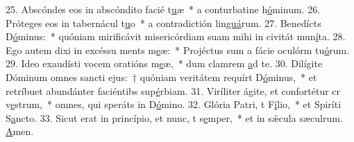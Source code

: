 25. Abscóndes eos in abscóndito facié t\uline{u}æ~* a conturbatine h\uline{ó}minum.
26. Próteges eos in tabernácul t\uline{u}o~* a contradictión lin\uline{guá}rum.
27. Benedícts D\uline{ó}minus:~* quóniam mirificávit misericórdiam suam mihi in civitát mun\uline{í}ta.
28. Ego autem dixi in excéssu ments m\uline{e}æ:~* Projéctus sum a fácie oculórm tu\uline{ó}rum.
29. Ideo exaudísti vocem oratións m\uline{e}æ,~* dum clamrem \uline{a}d te.
30. Dilígite Dóminum omnes sancti ejus:~† quóniam veritátem requírt D\uline{ó}minus,~* et retríbuet abundánter faciéntibs sup\uline{é}rbiam.
31. Viríliter ágite, et confortétur cr v\uline{e}strum,~* omnes, qui speráts in D\uline{ó}mino.
32. Glória Patri, t F\uline{í}lio,~* et Spiríti S\uline{a}ncto.
33. Sicut erat in princípio, et nunc, t s\uline{e}mper,~* et in sǽcula sæculrum. \uline{A}men.
